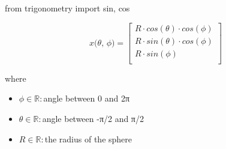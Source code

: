 \documentclass[12pt]{article}
\begin{document}
from trigonometry import sin, cos

\[
\textit{x(θ, ϕ)} = \begin{bmatrix}
\textit{R} \cdot cos(\textit{θ}) \cdot cos(\textit{ϕ})\\
\textit{R} \cdot sin(\textit{θ}) \cdot cos(\textit{ϕ})\\
\textit{R} \cdot sin(\textit{ϕ})\\
\end{bmatrix}
\]

where
\begin{itemize}
\item $\textit{ϕ} \in \mathbb{{R}}:$angle between 0 and 2π
\item $\textit{θ} \in \mathbb{{R}}:$angle between -π/2 and π/2
\item $\textit{R} \in \mathbb{{R}}:$the radius of the sphere
\end{itemize}
\end{document}
